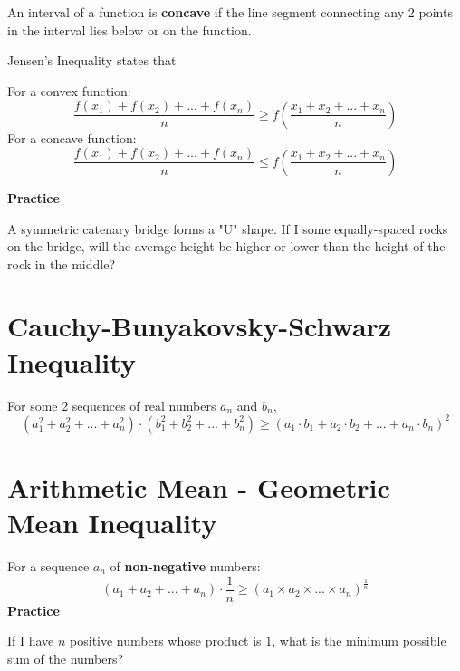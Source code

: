 An interval of a function is \textbf{concave} if the line segment connecting any 2 points in the interval lies below or on the function.

Jensen's Inequality states that

For a convex function:
\[\frac{f(x_1) + f(x_2) + ... + f(x_n)}{n} \geq f \left( \frac{x_1 + x_2 + ... + x_n}{n} \right ) \]
For a concave function:
\[\frac{f(x_1) + f(x_2) + ... + f(x_n)}{n} \leq f \left( \frac{x_1 + x_2 + ... + x_n}{n} \right ) \]

\textbf{Practice}
\begin{center}\end{center}
A symmetric catenary bridge forms a "U" shape. If I some equally-spaced rocks on the bridge, will the average
height be higher or lower than the height of the rock in the middle?
\section{Cauchy-Bunyakovsky-Schwarz Inequality}
For some 2 sequences of real numbers $a_n$ and $b_n$,
\[(a_1^2 + a_2^2 + ... + a_n^2) \cdot (b_1^2 + b_2^2 + ... + b_n^2) \geq (a_1 \cdot b_1 + a_2 \cdot b_2 + ... + a_n \cdot b_n)^2 \]

\section{Arithmetic Mean - Geometric Mean Inequality}
For a sequence $a_n$ of \textbf{non-negative} numbers:
\[\left(a_1 + a_2 + ... + a_n\right) \cdot \frac{1}{n} \geq (a_1 \times a_2 \times  ... \times a_n)^{\frac{1}{n}} \]
\textbf{Practice}

If I have $n$ positive numbers whose product is $1$, what is the minimum possible sum of the numbers?


